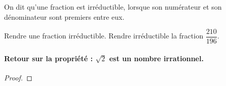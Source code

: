 \begin{Propriété}
On dit qu'une fraction est irréductible, lorsque son numérateur et son dénominateur sont premiers entre eux.
\end{Propriété}

\begin{Méthode}Rendre une fraction irréductible.
Rendre irréductible la fraction $\dfrac{210}{196}$.
\vspace{0.1cm}

\ligne

\vspace{0.5cm}
\begin{minipage}[c]{0.3\linewidth}
\begin{center}
\end{center}
\end{minipage} \hfill
\begin{minipage}[c]{0.6\linewidth}
\vspace{0.1cm}

\ligne

\ligne

\ligne

\ligne

\ligne

\ligne

\ligne

\end{minipage}

\end{Méthode}

\paragraph{Retour sur la propriété : $\sqrt{2}$ est un nombre irrationnel.}
\begin{proof}

\ligne

\ligne

\ligne

\ligne

\ligne

\ligne

\ligne

\ligne

\ligne

\ligne

\ligne

\ligne

\ligne

\ligne

\end{proof}

